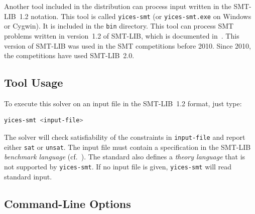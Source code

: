 \documentclass[11pt,twoside,fleqn,openright,titlepage]{cslreport}
\begin{document}
Another tool included in the distribution can process input written in
the SMT-LIB~1.2 notation. This tool is called \texttt{yices-smt} (or
\texttt{yices-smt.exe} on Windows or Cygwin). It is included in the
\texttt{bin} directory.  This tool can process SMT problems written in
version~1.2 of SMT-LIB, which is documented
in~\cite{SMTLIB12:2006}. This version of SMT-LIB was used in the SMT
competitions before 2010.  Since 2010, the competitions have used
SMT-LIB~2.0.


\subsection{Tool Usage}

To execute this solver on an input file in the SMT-LIB~1.2 format, just type:
\begin{small}
\begin{lstlisting}[language=sh]
   yices-smt <input-file>
\end{lstlisting}
\end{small}
The solver will check satisfiability of the constraints in
\texttt{input-file} and report either \texttt{sat} or
\texttt{unsat}. The input file must contain a specification in the
SMT-LIB {\em benchmark language\/} (cf.~\cite{SMTLIB12:2006}). The
standard also defines a {\em theory language\/} that is not supported
by \texttt{yices-smt}. If no input file is given, \texttt{yices-smt}
will read standard input.


\subsection{Command-Line Options}
\end{document}
